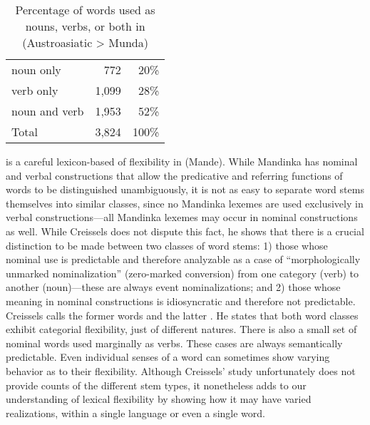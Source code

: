 \begin{table}[h]
  \centering
  \caption[Percentage of words used as nouns, verbs, or both in Mundari (Austroasiatic > Munda)]{Percentage of words used as nouns, verbs, or both in  (Austroasiatic > Munda) \parencite[383]{EvansOsada2005}}
  \label{tab:Evans-Osada-2005}
  \begin{tabular}{ l r r }
    \toprule
    noun only     &   772 &  20\% \\
    verb only     & 1,099 &  28\% \\
    noun and verb & 1,953 &  52\% \\
    \midrule
    Total         & 3,824 & 100\% \\
    \bottomrule
  \end{tabular}
\end{table}

\textcite{Creissels2017} is a careful lexicon-based of flexibility in  (Mande). While Mandinka has nominal and verbal constructions that allow the predicative and referring functions of words to be distinguished unambiguously, it is not as easy to separate word stems themselves into similar classes, since no Mandinka lexemes are used exclusively in verbal constructions—all Mandinka lexemes may occur in nominal constructions as well. While Creissels does not dispute this fact, he shows that there is a crucial distinction to be made between two classes of word stems: 1) those whose nominal use is predictable and therefore analyzable as a case of \enquote{morphologically unmarked nominalization} (zero-marked conversion) from one category (verb) to another (noun)—these are always event nominalizations; and 2) those whose meaning in nominal constructions is idiosyncratic and therefore not predictable. Creissels calls the former  words and the latter . He states that both word classes exhibit categorial flexibility, just of different natures. There is also a small set of nominal words used marginally as verbs. These cases are always semantically predictable. Even individual senses of a word can sometimes show varying behavior as to their flexibility. Although Creissels' study unfortunately does not provide counts of the different stem types, it nonetheless adds to our understanding of lexical flexibility by showing how it may have varied realizations, within a single language or even a single word.

